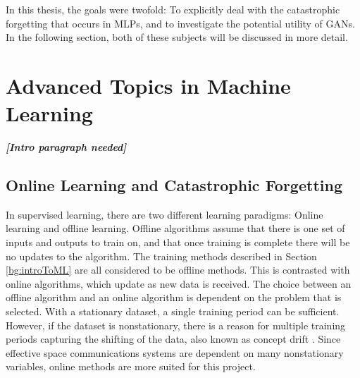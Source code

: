 	\par In this thesis, the goals were twofold: To explicitly deal with the catastrophic forgetting that occurs in MLPs, and to investigate the potential utility of GANs. In the following section, both of these subjects will be discussed in more detail.
	
	\section{Advanced Topics in Machine Learning}
	\par \textbf{\textit{[Intro paragraph needed]}}
	\subsection{Online Learning and Catastrophic Forgetting}\label{bg:onlineLearning}
	\par In supervised learning, there are two different learning paradigms: Online learning and offline learning. Offline algorithms assume that there is one set of inputs and outputs to train on, and that once training is complete there will be no updates to the algorithm. The training methods described in Section \ref{bg:introToML} are all considered to be offline methods. This is contrasted with online algorithms, which update as new data is received. The choice between an offline algorithm and an online algorithm is dependent on the problem that is selected. With a stationary dataset, a single training period can be sufficient. However, if the dataset is nonstationary, there is a reason for multiple training periods capturing the shifting of the data, also known as concept drift \cite{placeholderCitation}. Since effective space communications systems are dependent on many nonstationary variables, online methods are more suited for this project.
